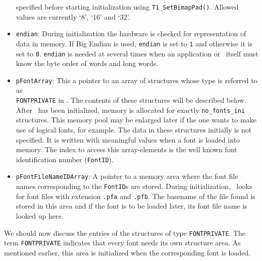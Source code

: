 \begin{itemize}
  specified before starting initialization using
  \verb+T1_SetBimapPad()+. Allowed values are currently `8', `16' and `32'. 
\item \verb+endian+: During initialization the hardware is checked for
  representation of data in memory. If Big Endian is used, \verb+endian+ is
  set to \verb+1+ and otherwise it is set to \verb+0+. \verb+endian+ is needed
  at several times when an application or \tonelib\ itself must know the
  byte order of words and long words.
\item \verb+pFontArray+: This a pointer to an array of structures whose type
  is referred to as \\
  \verb+FONTPRIVATE+ in \tonelib. The contents of these
  structures will be described below. After \tonelib\ has been
  initialized, memory is allocated for exactly \verb+no_fonts_ini+
  structures. This memory pool may be enlarged later if the one wants to make
  use of logical fonts, for example. The data in these structures initially is
  not specified. It is written with meaningful values when a font is loaded
  into memory. The index to access this array-elements is the well known font
  identification number (\verb+FontID+).
\item \verb+pFontFileNameIDArray+: A pointer to a memory area where the
  font file names corresponding to the \verb+FontID+s are stored. During
  initialization, \tonelib\ looks for font files with extension \verb+.pfa+
  and \verb+.pfb+. The basename of the file found is stored in this area and
  if the font is to be loaded later, its font file name is looked up here.
\end{itemize}
We should now discuss the entries of the structures of type
\verb+FONTPRIVATE+. The term \verb+FONTPRIVATE+ indicates that every font
needs its own structure area. As mentioned earlier, this area is initialized
when the corresponding font is loaded.

